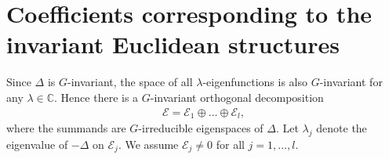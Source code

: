 \documentclass[10pt]{amsart}
\theoremstyle{remark}
\begin{document}
\section{Coefficients corresponding to the
invariant Euclidean structures}\label{seccoef}

Since ${{\mathord{\Delta}}}$ is $G$-invariant, the space of all
${{\mathord{\lambda}}}$-eigenfunctions is also $G$-invariant for any ${{\mathord{\lambda}}}\in{\mathbb{C}}$.
Hence there is a $G$-invariant orthogonal decomposition
\begin{eqnarray}\label{decce}
{\mathcal{E}}={\mathcal{E}}_1\oplus\dots\oplus{\mathcal{E}}_l,
\end{eqnarray}
where the summands are $G$-irreducible eigenspaces of ${{\mathord{\Delta}}}$. Let
${{\mathord{\lambda}}}_j$ denote the eigenvalue of $-{{\mathord{\Delta}}}$ on ${\mathcal{E}}_j$. We assume
${\mathcal{E}}_j\neq0$ for all $j=1,\dots,l$.
\end{document}
